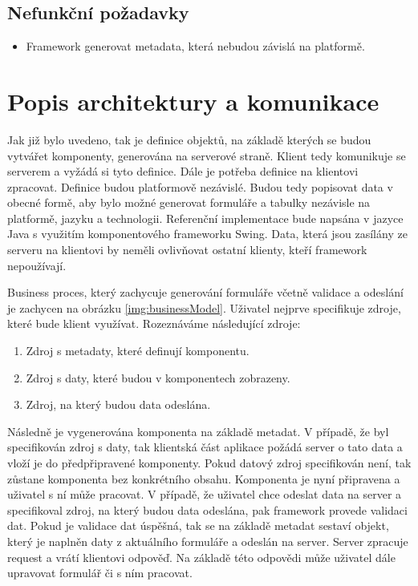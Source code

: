 \subsection{Nefunkční požadavky}
\begin{itemize}
\item Framework generovat metadata, která nebudou závislá na platformě.
\end{itemize} 
\section{Popis architektury a komunikace}
Jak již bylo uvedeno, tak je definice objektů, na základě kterých se budou vytvářet komponenty, generována na serverové straně. Klient tedy komunikuje se serverem a vyžádá si tyto definice. Dále je potřeba definice na klientovi zpracovat. Definice budou platformově nezávislé. Budou tedy popisovat data v obecné formě, aby bylo možné generovat formuláře a tabulky nezávisle na platformě, jazyku a technologii. Referenční implementace bude napsána v jazyce Java s využitím komponentového frameworku Swing. Data, která jsou zasílány ze serveru na klientovi by neměli ovlivňovat ostatní klienty, kteří framework nepoužívají. 

Business proces, který zachycuje generování formuláře včetně validace a odeslání je zachycen na obrázku \ref{img:businessModel}. Uživatel nejprve specifikuje zdroje, které bude klient využívat. Rozeznáváme následující zdroje:
\begin{enumerate}
\item Zdroj s metadaty, které definují komponentu.
\item Zdroj s daty, které budou v komponentech zobrazeny.
\item Zdroj, na který budou data odeslána.
\end{enumerate}
Následně je vygenerována komponenta na základě metadat. V případě, že byl specifikován zdroj s daty, tak klientská část aplikace požádá server o tato data a vloží je do předpřipravené komponenty. Pokud datový zdroj specifikován není, tak zůstane komponenta bez konkrétního obsahu. Komponenta je nyní připravena a uživatel s ní může pracovat. V případě, že uživatel chce odeslat data na server a specifikoval zdroj, na který budou data odeslána, pak framework provede validaci dat. Pokud je validace dat úspěšná, tak se na základě metadat sestaví objekt, který je naplněn daty z aktuálního formuláře a odeslán na server. Server zpracuje request a vrátí klientovi odpověď. Na základě této odpovědi může uživatel dále upravovat formulář či s ním pracovat.

